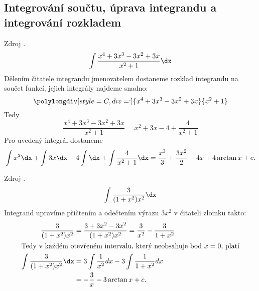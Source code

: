     \subsection{Integrování součtu, úprava integrandu a integrování rozkladem}
      \begin{example}
        Zdroj \cite[s.~29]{Knichal}.
        \begin{equation}\label{MA:int_ex_01}
          \int{\frac{x^4+3x^3-3x^2+3x}{x^2+1}\dx}
        \end{equation}
        Dělením čitatele integrandu jmenovatelem  dostaneme rozklad integrandu na součet funkcí,
        jejich integrály najdeme snadno:
         \begin{equation*} 
           \polylongdiv[style=C,div=:]{x^4+3x^3-3x^2+3x}{x^2+1}
         \end{equation*}
         Tedy
         \begin{equation*}
           \frac{x^4+3x^3-3x^2+3x}{x^2+1} = x^2+3x-4+\frac{4}{x^2+1}  
         \end{equation*}
         Pro uvedený integrál dostaneme
         \begin{equation*}
           \int{x^2}\dx+\int{3x}\dx-4\int\dx+\int{\frac{4}{x^2+1}\dx}
            = \frac{x^3}{3}+\frac{3x^2}{2}-4x+4\arctan x + c.
         \end{equation*}
      \end{example}
      
      \begin{example}
        Zdroj \cite[s.~29]{Knichal}.
        \begin{equation}\label{MA:int_ex_02}
          \int\frac{3}{(1+x^2)x^2}\dx
        \end{equation}
        Integrand upravíme přičtením a odečtením výrazu $3x^2$ v čitateli zlomku takto:
        \begin{align*}
          \frac{3}{(1+x^2)x^2} 
            &= \frac{3+3x^2-3x^2}{(1+x^2)x^2} = \frac{3}{x^2}-\frac{3}{1+x^2}                      \\  
          \intertext{Tedy v každém otevřeném intervalu, který neobsahuje bod \(x=0\), platí}
          \int{\frac{3}{(1+x^2)x^2}\dx} 
            &= 3\int{\frac{1}{x^2}dx} - 3\int{\frac{1}{1+x^2}dx}                                   \\
            &= -\frac{3}{x}-3\arctan x + c. 
        \end{align*}
      \end{example}
      

